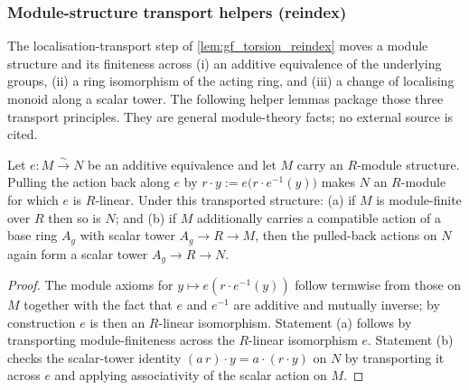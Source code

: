 \subsubsection{Module-structure transport helpers (reindex)}
\label{sec:gf_reindex_transport_helpers}

The localisation-transport step of \cref{lem:gf_torsion_reindex} moves a module structure
and its finiteness across (i) an additive equivalence of the underlying groups, (ii) a ring
isomorphism of the acting ring, and (iii) a change of localising monoid along a scalar
tower. The following helper lemmas package those three transport principles. They are general
module-theory facts; no external source is cited.

\begin{lemma}
  \label{lem:gf_pullback_module_transport}
  Let \(e : M \xrightarrow{\sim} N\) be an additive equivalence and let \(M\) carry an
  \(R\)-module structure. Pulling the action back along \(e\) by
  \(r \cdot y := e\big(r \cdot e^{-1}(y)\big)\) makes \(N\) an \(R\)-module for which \(e\)
  is \(R\)-linear. Under this transported structure: (a) if \(M\) is module-finite over
  \(R\) then so is \(N\); and (b) if \(M\) additionally carries a compatible action of a
  base ring \(A_g\) with scalar tower \(A_g \to R \to M\), then the pulled-back actions on
  \(N\) again form a scalar tower \(A_g \to R \to N\).
\end{lemma}
\begin{proof}

\leanok
  The module axioms for \(y \mapsto e(r \cdot e^{-1}(y))\) follow termwise from those on
  \(M\) together with the fact that \(e\) and \(e^{-1}\) are additive and mutually inverse;
  by construction \(e\) is then an \(R\)-linear isomorphism. Statement (a) follows by
  transporting module-finiteness across the \(R\)-linear isomorphism \(e\).
  Statement (b) checks the scalar-tower identity
  \((a\,r)\cdot y = a\cdot(r\cdot y)\) on \(N\) by transporting it across \(e\) and applying
  associativity of the scalar action on \(M\).
\end{proof}

